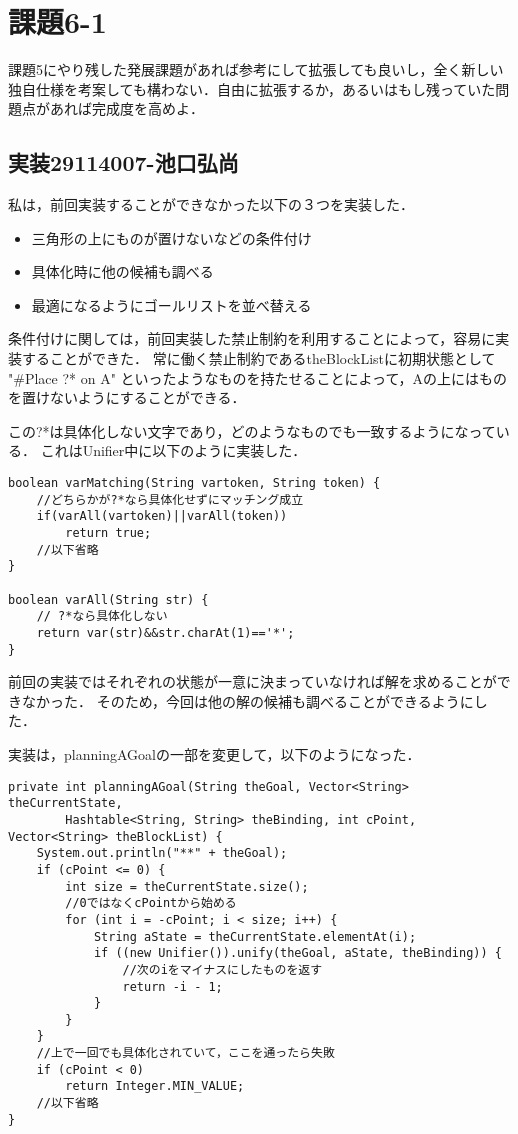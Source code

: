 \documentclass{jarticle}
\begin{document}
\section{課題6-1}
\begin{screen}
課題5にやり残した発展課題があれば参考にして拡張しても良いし，全く新しい独自仕様を考案しても構わない．自由に拡張するか，あるいはもし残っていた問題点があれば完成度を高めよ．
\end{screen}
\subsection{実装29114007-池口弘尚}
私は，前回実装することができなかった以下の３つを実装した．
\begin{itemize}
\item 三角形の上にものが置けないなどの条件付け
\item 具体化時に他の候補も調べる
\item 最適になるようにゴールリストを並べ替える
\end{itemize}

条件付けに関しては，前回実装した禁止制約を利用することによって，容易に実装することができた．
常に働く禁止制約であるtheBlockListに初期状態として
"\#Place ?* on A"
といったようなものを持たせることによって，Aの上にはものを置けないようにすることができる．

この?*は具体化しない文字であり，どのようなものでも一致するようになっている．
これはUnifier中に以下のように実装した．

\begin{lstlisting}[caption=具体化しない変数の実装,label=src:unifier]
boolean varMatching(String vartoken, String token) {
    //どちらかが?*なら具体化せずにマッチング成立
    if(varAll(vartoken)||varAll(token))
        return true;
    //以下省略
}

boolean varAll(String str) {
    // ?*なら具体化しない
    return var(str)&&str.charAt(1)=='*';
}
\end{lstlisting}

前回の実装ではそれぞれの状態が一意に決まっていなければ解を求めることができなかった．
そのため，今回は他の解の候補も調べることができるようにした．

実装は，planningAGoalの一部を変更して，以下のようになった．

\begin{lstlisting}[caption=他の具体化も調べる,label=src:planagoal]
private int planningAGoal(String theGoal, Vector<String> theCurrentState,
        Hashtable<String, String> theBinding, int cPoint, Vector<String> theBlockList) {
    System.out.println("**" + theGoal);
    if (cPoint <= 0) {
        int size = theCurrentState.size();
        //0ではなくcPointから始める
        for (int i = -cPoint; i < size; i++) {
            String aState = theCurrentState.elementAt(i);
            if ((new Unifier()).unify(theGoal, aState, theBinding)) {
                //次のiをマイナスにしたものを返す
                return -i - 1;
            }
        }
    }
    //上で一回でも具体化されていて，ここを通ったら失敗
    if (cPoint < 0)
        return Integer.MIN_VALUE;
    //以下省略
}
\end{lstlisting}
\end{document}
